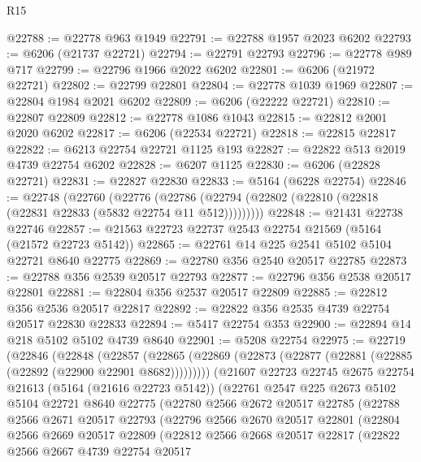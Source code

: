\begin{lexlean}{R15}
\begin{coremodule}
{{{{{{{{{{{@22788 := @22778 @963 @1949
@22791 := @22788 @1957 @2023 @6202
@22793 := @6206 (@21737 @22721)
@22794 := @22791 @22793
@22796 := @22778 @989 @717
@22799 := @22796 @1966 @2022 @6202
@22801 := @6206 (@21972 @22721)
@22802 := @22799 @22801
@22804 := @22778 @1039 @1969
@22807 := @22804 @1984 @2021 @6202
@22809 := @6206 (@22222 @22721)
@22810 := @22807 @22809
@22812 := @22778 @1086 @1043
@22815 := @22812 @2001 @2020 @6202
@22817 := @6206 (@22534 @22721)
@22818 := @22815 @22817
@22822 := @6213 @22754 @22721 @1125 @193
@22827 := @22822 @513 @2019 @4739 @22754 @6202
@22828 := @6207 @1125
@22830 := @6206 (@22828 @22721)
@22831 := @22827 @22830
@22833 := @5164 (@6228 @22754)
@22846 := @22748
    (@22760
      (@22776 (@22786 (@22794 (@22802 (@22810 (@22818 (@22831 @22833 (@5832 @22754 @11 @512)))))))))
@22848 := @21431 @22738 @22746
@22857 := @21563 @22723 @22737 @2543 @22754 @21569 (@5164 (@21572 @22723 @5142))
@22865 := @22761 @14 @225 @2541 @5102 @5104 @22721 @8640 @22775
@22869 := @22780 @356 @2540 @20517 @22785
@22873 := @22788 @356 @2539 @20517 @22793
@22877 := @22796 @356 @2538 @20517 @22801
@22881 := @22804 @356 @2537 @20517 @22809
@22885 := @22812 @356 @2536 @20517 @22817
@22892 := @22822 @356 @2535 @4739 @22754 @20517 @22830 @22833
@22894 := @5417 @22754 @353
@22900 := @22894 @14 @218 @5102 @5102 @4739 @8640
@22901 := @5208 @22754
@22975 := @22719
    (@22846
      (@22848
        (@22857
          (@22865 (@22869 (@22873 (@22877 (@22881 (@22885 (@22892 (@22900 @22901 @8682)))))))))
        (@21607
          @22723
          @22745
          @2675
          @22754
          @21613
          (@5164 (@21616 @22723 @5142))
          (@22761
            @2547
            @225
            @2673
            @5102
            @5104
            @22721
            @8640
            @22775
            (@22780
              @2566
              @2672
              @20517
              @22785
              (@22788
                @2566
                @2671
                @20517
                @22793
                (@22796
                  @2566
                  @2670
                  @20517
                  @22801
                  (@22804
                    @2566
                    @2669
                    @20517
                    @22809
                    (@22812
                      @2566
                      @2668
                      @20517
                      @22817
                      (@22822
                        @2566
                        @2667
                        @4739
                        @22754
                        @20517
}}}}}}}}}}}
\end{coremodule}
\end{lexlean}

